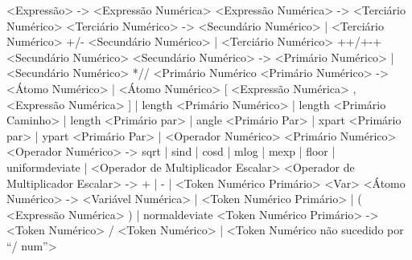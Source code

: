 <Expressão> -> <Expressão Numérica>
<Expressão Numérica> -> <Terciário Numérico>
<Terciário Numérico> -> <Secundário Numérico> |
                        <Terciário Numérico> +/- <Secundário Numérico> |
                        <Terciário Numérico> ++/+-+ <Secundário Numérico>
<Secundário Numérico> -> <Primário Numérico> |
                         <Secundário Numérico> *// <Primário Numérico
<Primário Numérico> -> <Átomo Numérico> |
                       <Átomo Numérico> [ <Expressão Numérica> , <Expressão Numérica> ] |
                       length <Primário Numérico> |
                       length <Primário Caminho>  |
                       length <Primário par> |
                       angle <Primário Par> |
                       xpart <Primário par> |
                       ypart <Primário Par> |
                       <Operador Numérico> <Primário Numérico>
<Operador Numérico> -> sqrt | sind | cosd | mlog | mexp | floor |
                       uniformdeviate |
                       <Operador de Multiplicador Escalar>
<Operador de Multiplicador  Escalar> -> + | - |
                                        <Token Numérico Primário> <Var>
<Átomo Numérico> -> <Variável Numérica> |
                    <Token Numérico Primário> |
                    ( <Expressão Numérica> ) |
                    normaldeviate
<Token Numérico Primário> -> <Token Numérico> / <Token Numérico> |
                             <Token Numérico não sucedido por ``/ num''>





\fim
